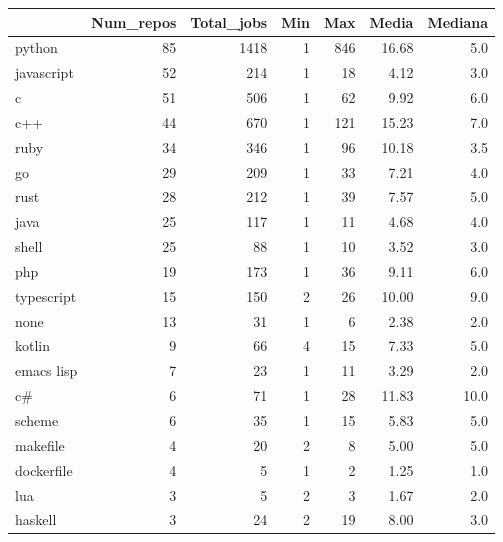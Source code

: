 \begin{tabular}{lrrrrrr}
\toprule
{} &  Num\_repos &  Total\_jobs &  Min &  Max &  Media &  Mediana \\
\midrule
python           &         85 &        1418 &    1 &  846 &  16.68 &      5.0 \\
javascript       &         52 &         214 &    1 &   18 &   4.12 &      3.0 \\
c                &         51 &         506 &    1 &   62 &   9.92 &      6.0 \\
c++              &         44 &         670 &    1 &  121 &  15.23 &      7.0 \\
ruby             &         34 &         346 &    1 &   96 &  10.18 &      3.5 \\
go               &         29 &         209 &    1 &   33 &   7.21 &      4.0 \\
rust             &         28 &         212 &    1 &   39 &   7.57 &      5.0 \\
java             &         25 &         117 &    1 &   11 &   4.68 &      4.0 \\
shell            &         25 &          88 &    1 &   10 &   3.52 &      3.0 \\
php              &         19 &         173 &    1 &   36 &   9.11 &      6.0 \\
typescript       &         15 &         150 &    2 &   26 &  10.00 &      9.0 \\
none             &         13 &          31 &    1 &    6 &   2.38 &      2.0 \\
kotlin           &          9 &          66 &    4 &   15 &   7.33 &      5.0 \\
emacs lisp       &          7 &          23 &    1 &   11 &   3.29 &      2.0 \\
c\#               &          6 &          71 &    1 &   28 &  11.83 &     10.0 \\
scheme           &          6 &          35 &    1 &   15 &   5.83 &      5.0 \\
makefile         &          4 &          20 &    2 &    8 &   5.00 &      5.0 \\
dockerfile       &          4 &           5 &    1 &    2 &   1.25 &      1.0 \\
lua              &          3 &           5 &    2 &    3 &   1.67 &      2.0 \\
haskell          &          3 &          24 &    2 &   19 &   8.00 &      3.0 \\

\end{tabular}
